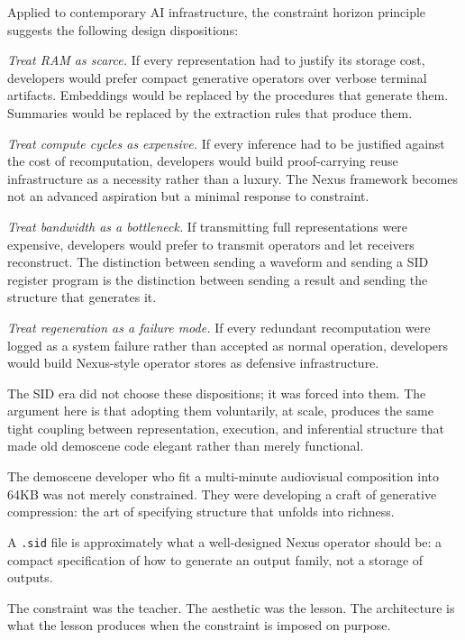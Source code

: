Applied to contemporary AI infrastructure, the constraint
horizon principle suggests the following design
dispositions:

\textit{Treat RAM as scarce.} If every representation
had to justify its storage cost, developers would
prefer compact generative operators over verbose
terminal artifacts. Embeddings would be replaced
by the procedures that generate them. Summaries would
be replaced by the extraction rules that produce them.

\textit{Treat compute cycles as expensive.} If every
inference had to be justified against the cost of
recomputation, developers would build proof-carrying
reuse infrastructure as a necessity rather than a
luxury. The Nexus framework becomes not an advanced
aspiration but a minimal response to constraint.

\textit{Treat bandwidth as a bottleneck.} If
transmitting full representations were expensive,
developers would prefer to transmit operators and
let receivers reconstruct. The distinction between
sending a waveform and sending a SID register program
is the distinction between sending a result and
sending the structure that generates it.

\textit{Treat regeneration as a failure mode.} If
every redundant recomputation were logged as a system
failure rather than accepted as normal operation,
developers would build Nexus-style operator stores
as defensive infrastructure.

The SID era did not choose these dispositions; it
was forced into them. The argument here is that
adopting them voluntarily, at scale, produces the
same tight coupling between representation, execution,
and inferential structure that made old demoscene
code elegant rather than merely functional.

\begin{interlude}
  The demoscene developer who fit a multi-minute
  audiovisual composition into 64KB was not merely
  constrained. They were developing a craft of
  generative compression: the art of specifying
  structure that unfolds into richness.

  A \texttt{.sid} file is approximately
  what a well-designed Nexus operator should be:
  a compact specification of how to generate an
  output family, not a storage of outputs.

  The constraint was the teacher.
  The aesthetic was the lesson.
  The architecture is what the lesson produces
  when the constraint is imposed on purpose.
\end{interlude}

